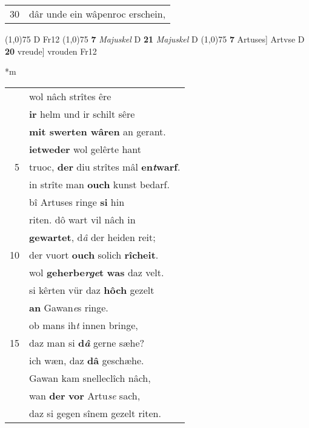 \documentclass[8pt,a4paper,notitlepage]{article}
\begin{document}
\begin{table}[ht]
\begin{minipage}[t]{0.5\linewidth}
\begin{tabular}{rl}
30 & dâr unde ein wâpenroc erschein,\\ 
\end{tabular}
\scriptsize
\line(1,0){75} \newline
D Fr12 \newline
\line(1,0){75} \newline
\textbf{7} \textit{Majuskel} D  \textbf{21} \textit{Majuskel} D  \newline
\line(1,0){75} \newline
\textbf{7} Artuses] Artvse D \textbf{20} vreude] vrouden Fr12 \newline
\end{minipage}
\hspace{0.5cm}
\begin{minipage}[t]{0.5\linewidth}
\small
\begin{center}*m
\end{center}
\begin{tabular}{rl}
 & wol nâch strîtes êre\\ 
 & \textbf{ir} helm und ir schilt sêre\\ 
 & \textbf{mit swerten wâren} an gerant.\\ 
 & \textbf{ietweder} wol gelêrte hant\\ 
5 & truoc, \textbf{der} diu strîtes mâl \textbf{en\textit{t}warf}.\\ 
 & in strîte man \textbf{ouch} kunst bedarf.\\ 
 & bî Artuses ringe \textbf{si} hin\\ 
 & riten. dô wart vil nâch in\\ 
 & \textbf{gewartet}, d\textit{â} der heiden reit;\\ 
10 & der vuort \textbf{ouch} solich \textbf{rîcheit}.\\ 
 & wol \textbf{geherbe\textit{rge}t} \textbf{was} daz velt.\\ 
 & si kêrten vür daz \textbf{hôch} gezelt\\ 
 & \textbf{an} Gawan\textit{e}s ringe.\\ 
 & ob mans ih\textit{t} innen bringe,\\ 
15 & daz man si \textbf{d\textit{â}} gerne sæhe?\\ 
 & ich wæn, daz \textbf{dâ} geschæhe.\\ 
 & Gawan kam snelleclîch nâch,\\ 
 & wan \textbf{der} \textbf{vor} Artu\textit{se} sach,\\ 
 & daz si gegen sînem gezelt riten.\\ 

\end{tabular}
\end{minipage}
\end{table}
\end{document}
